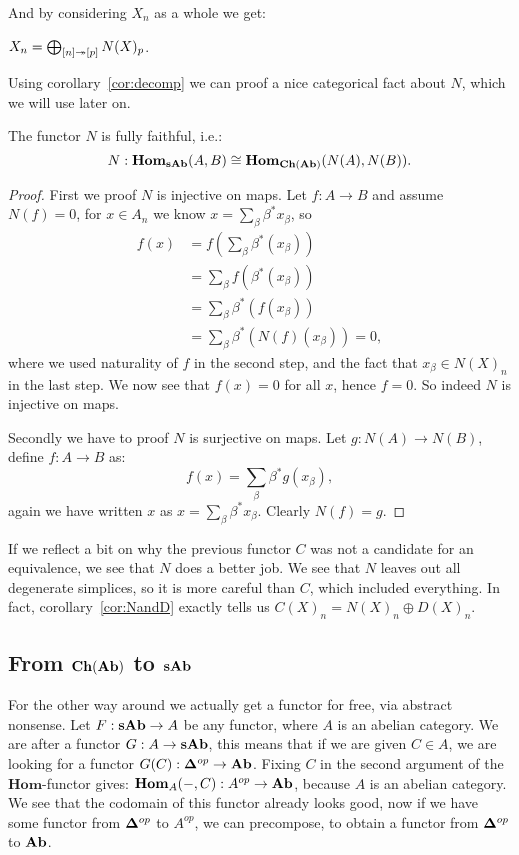 And by considering $X_n$ as a whole we get:

\begin{corollary}
	$X_n = \bigoplus_{[n] \twoheadrightarrow [p]} N(X)_p$.
\end{corollary}

Using corollary~\ref{cor:decomp} we can proof a nice categorical fact about $N$, which we will use later on.
\begin{lemma}
	The functor $N$ is fully faithful, i.e.:
	$$ N : \mathbf{Hom}_{\mathbf{sAb}}(A, B) \cong \mathbf{Hom}_{\mathbf{Ch}(\mathbf{Ab})}(N(A), N(B)). $$
\end{lemma}
\begin{proof}
	First we proof $N$ is injective on maps. Let $f: A \to B$ and assume $N(f) = 0$, for $x \in A_n$ we know $x = \sum_\beta \beta^\ast x_\beta$, so
	\begin{align*}
		f(x) &= \textstyle f(\sum_\beta \beta^\ast (x_\beta)) \\
			&= \textstyle \sum_\beta f(\beta^\ast (x_\beta)) \\ 
			&= \textstyle \sum_\beta \beta^\ast (f (x_\beta)) \\ 
			&= \textstyle \sum_\beta \beta^\ast (N(f) (x_\beta)) = 0,	
	\end{align*}
	where we used naturality of $f$ in the second step, and the fact that $x_\beta \in N(X)_n$ in the last step. We now see that $f(x) = 0$ for all $x$, hence $f = 0$. So indeed $N$ is injective on maps.

	Secondly we have to proof $N$ is surjective on maps. Let $g : N(A) \to N(B)$, define $f : A \to B$ as:
	$$ f(x) = \sum_\beta \beta^\ast g(x_\beta), $$
	again we have written $x$ as $x = \sum_\beta \beta^\ast x_\beta$. Clearly $N(f) = g$. 
\end{proof}

If we reflect a bit on why the previous functor $C$ was not a candidate for an equivalence, we see that $N$ does a better job. We see that $N$ leaves out all degenerate simplices, so it is more careful than $C$, which included everything. In fact, corollary~\ref{cor:NandD} exactly tells us $C(X)_n = N(X)_n \oplus D(X)_n$.

\subsection{From $\mathbf{Ch}(\mathbf{Ab})$ to $\mathbf{sAb}$}
For the other way around we actually get a functor for free, via abstract nonsense. Let $F : \mathbf{sAb} \to A$ be any functor, where $A$ is an abelian category. We are after a functor $G : A \to \mathbf{sAb}$, this means that if we are given $C \in A$, we are looking for a functor $G(C) : \mathbf{\Delta}^{op} \to \mathbf{Ab}$. Fixing $C$ in the second argument of the $\mathbf{Hom}$-functor gives: $\mathbf{Hom}_{A}(-, C) : A^{op} \to \mathbf{Ab}$, because $A$ is an abelian category. We see that the codomain of this functor already looks good, now if we have some functor from $\mathbf{\Delta}^{op}$ to $A^{op}$, we can precompose, to obtain a functor from $\mathbf{\Delta}^{op}$ to $\mathbf{Ab}$.

